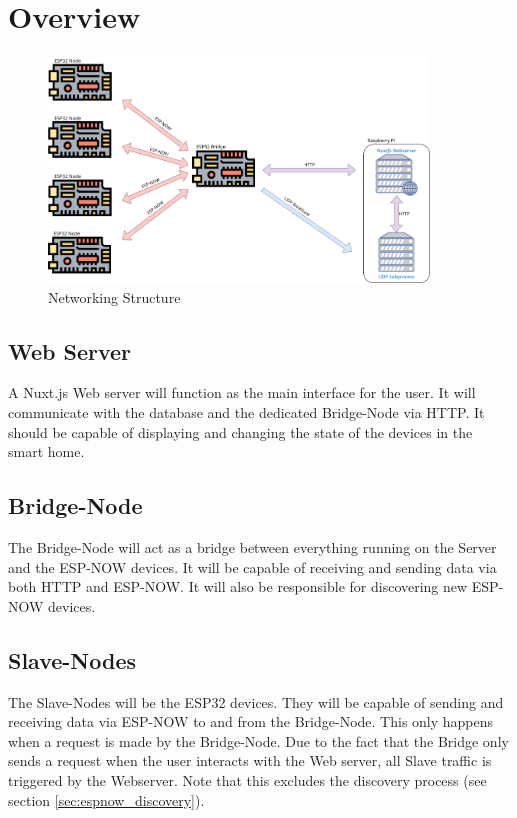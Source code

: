\section{Overview}

    \begin{figure}[H]
        \centering
        \includegraphics[width=0.9\textwidth]{topics/flowcharts/Networking.png}
        \caption{Networking Structure}
    \end{figure}
    \subsection{Web Server}
    A Nuxt.js Web server will function as the main interface
    for the user. It will communicate with the database and the
    dedicated Bridge-Node via HTTP. It should be capable of displaying
    and changing the state of the devices in the smart home.
    \subsection{Bridge-Node}
    The Bridge-Node will act as a bridge between everything running
    on the Server and the ESP-NOW devices.
    It will be capable of receiving and sending data via both HTTP and
    ESP-NOW. It will also be responsible for discovering new ESP-NOW
    devices.
    \subsection{Slave-Nodes}
    The Slave-Nodes will be the ESP32 devices. They will be capable of
    sending and receiving data via ESP-NOW to and from the Bridge-Node.
    This only happens when a request is made by the Bridge-Node. Due to 
    the fact that the Bridge only sends a request when the user interacts
    with the Web server, all Slave traffic is triggered by the Webserver.
    Note that this excludes the discovery process (see section \ref{sec:espnow_discovery}).

